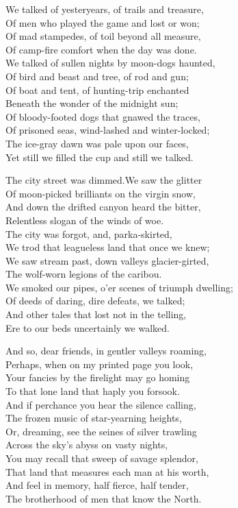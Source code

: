 
\begin{poemblock}
We talked of yesteryears, of trails and treasure,\\
\idt Of men who played the game and lost or won;\\
Of mad stampedes, of toil beyond all measure,\\
\idt Of camp-fire comfort when the day was done.\\
We talked of sullen nights by moon-dogs haunted,\\
\idt Of bird and beast and tree, of rod and gun;\\
Of boat and tent, of hunting-trip enchanted\\
\idt Beneath the wonder of the midnight sun;\\
Of bloody-footed dogs that gnawed the traces,\\
\idt Of prisoned seas, wind-lashed and winter-locked;\\
The ice-gray dawn was pale upon our faces,\\
\idt Yet still we filled the cup and still we talked.

The city street was dimmed.\idt We saw the glitter\\
\idt Of moon-picked brilliants on the virgin snow,\\
And down the drifted canyon heard the bitter,\\
\idt Relentless slogan of the winds of woe.\\
The city was forgot, and, parka-skirted,\\
\idt We trod that leagueless land that once we knew;\\
We saw stream past, down valleys glacier-girted,\\
\idt The wolf-worn legions of the caribou.\\
We smoked our pipes, o'er scenes of triumph dwelling;\\
\idt Of deeds of daring, dire defeats, we talked;\\
And other tales that lost not in the telling,\\
\idt Ere to our beds uncertainly we walked.

And so, dear friends, in gentler valleys roaming,\\
\idt Perhaps, when on my printed page you look,\\
Your fancies by the firelight may go homing\\
\idt To that lone land that haply you forsook.\\
And if perchance you hear the silence calling,\\
\idt The frozen music of star-yearning heights,\\
Or, dreaming, see the seines of silver trawling\\
\idt Across the sky's abyss on vasty nights,\\
You may recall that sweep of savage splendor,\\
\idt That land that measures each man at his worth,\\
And feel in memory, half fierce, half tender,\\
\idt  The brotherhood of men that know the North.

\end{poemblock}
